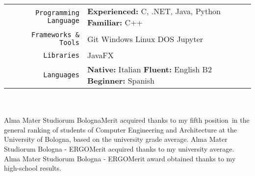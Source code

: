 \documentclass[
    10pt,
    A4,
    english,
    draft = false,
    twoside = false,
]{article}
\begin{document}
	\tab \begin{tabular}{r p{}}
		\texttt{\large Programming Language} & \textbf{Experienced:} C, .NET, Java, Python \tab \textbf{Familiar:} C++ \\
		\texttt{\large Frameworks \& Tools} & Git \cvContactSep Windows \cvContactSep Linux \cvContactSep DOS \cvContactSep Jupyter \\
		\texttt{\large Libraries} & JavaFX\\
		\texttt{\large Languages} & \textbf{Native:} Italian \cvContactSep \textbf{Fluent:} English B2 \cvContactSep \textbf{Beginner:} Spanish \\
	\end{tabular}\\~\\
	{Alma Mater Studiorum Bologna}{Merit acquired thanks to my fifth position\ in the general ranking of students of Computer Engineering and Architecture
    at the University of Bologna, based on the university grade average.}
	{Alma Mater Studiorum Bologna - ERGO}{Merit acquired thanks to my university average.}
	{Alma Mater Studiorum Bologna - ERGO}{Merit award obtained thanks to my high-school results.}
	
\end{document}
